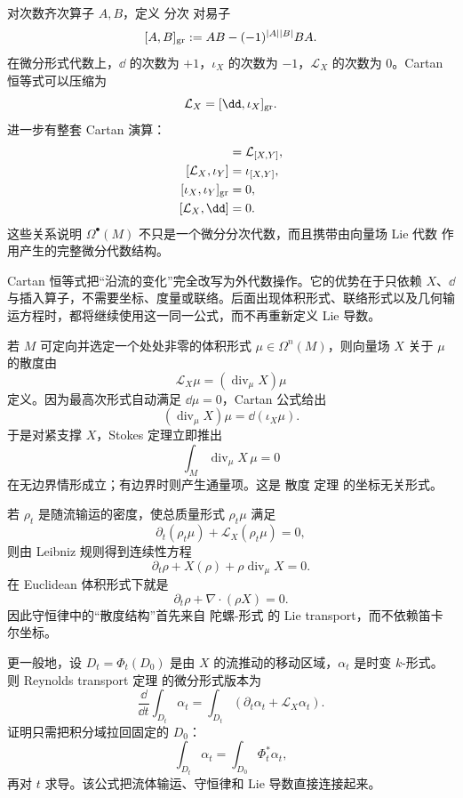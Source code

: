 对次数齐次算子 $A,B$，定义 分次 对易子
\[
[A,B]_{\rm gr}
:=AB-(-1)^{|A||B|}BA.
\]
在微分形式代数上，$\dd$ 的次数为 $+1$，$\iota_X$ 的次数为 $-1$，$\mathcal L_X$ 的次数为 $0$。Cartan 恒等式可以压缩为
\[
\mathcal L_X=[\dd,\iota_X]_{\rm gr}.
\]
进一步有整套 Cartan 演算：
\begin{align}
[\mathcal L_X,\mathcal L_Y]&=\mathcal L_{[X,Y]},
\label{eq:cartan-lie-lie}\\
[\mathcal L_X,\iota_Y]&=\iota_{[X,Y]},
\label{eq:cartan-lie-iota}\\
[\iota_X,\iota_Y]_{\rm gr}&=0,
\label{eq:cartan-iota-iota}\\
[\mathcal L_X,\dd]&=0.
\label{eq:cartan-lie-d}
\end{align}
这些关系说明 $\Omega^\bullet(M)$ 不只是一个微分分次代数，而且携带由向量场 Lie 代数 作用产生的完整微分代数结构。

Cartan 恒等式把“沿流的变化”完全改写为外代数操作。它的优势在于只依赖 $X$、$\dd$ 与插入算子，不需要坐标、度量或联络。后面出现体积形式、联络形式以及几何输运方程时，都将继续使用这一同一公式，而不再重新定义 Lie 导数。

若 $M$ 可定向并选定一个处处非零的体积形式 $\mu\in\Omega^n(M)$，则向量场 $X$ 关于 $\mu$ 的散度由
\begin{equation*}\mathcal L_X\mu=(\operatorname{div}_\mu X)\mu\end{equation*}
定义。因为最高次形式自动满足 $\dd\mu=0$，Cartan 公式给出
\begin{equation*}(\operatorname{div}_\mu X)\mu
=\dd(\iota_X\mu).\end{equation*}
于是对紧支撑 $X$，Stokes 定理立即推出
\[
\int_M\operatorname{div}_\mu X\,\mu=0
\]
在无边界情形成立；有边界时则产生通量项。这是 散度 定理 的坐标无关形式。

若 $\rho_t$ 是随流输运的密度，使总质量形式 $\rho_t\mu$ 满足
\[
\partial_t(\rho_t\mu)+\mathcal L_X(\rho_t\mu)=0,
\]
则由 Leibniz 规则得到连续性方程
\begin{equation*}\partial_t\rho+X(\rho)+\rho\operatorname{div}_\mu X=0.\end{equation*}
在 Euclidean 体积形式下就是
\[
\partial_t\rho+\nabla\cdot(\rho X)=0.
\]
因此守恒律中的“散度结构”首先来自 陀螺-形式 的 Lie transport，而不依赖笛卡尔坐标。

更一般地，设 $D_t=\Phi_t(D_0)$ 是由 $X$ 的流推动的移动区域，$\alpha_t$ 是时变 $k$-形式。则 Reynolds transport 定理 的微分形式版本为
\begin{equation*}\frac{\dd}{\dd t}\int_{D_t}\alpha_t
=\int_{D_t}(\partial_t\alpha_t+\mathcal L_X\alpha_t).\end{equation*}
证明只需把积分域拉回固定的 $D_0$：
\[
\int_{D_t}\alpha_t
=\int_{D_0}\Phi_t^*\alpha_t,
\]
再对 $t$ 求导。该公式把流体输运、守恒律和 Lie 导数直接连接起来。

